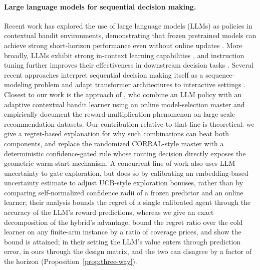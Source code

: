 \documentclass[anon]{alt2027} %
\begin{document}
\paragraph{Large language models for sequential decision making.}
Recent work has explored the use of large language models (LLMs) as policies
in contextual bandit environments, demonstrating that frozen pretrained
models can achieve strong short-horizon performance even without online
updates \citep{chen2024llmdecision}. More broadly, LLMs exhibit strong
in-context learning capabilities \citep{brown2020language,xie2021explanation,
garg2022can,akyurek2022learning}, and instruction tuning further improves
their effectiveness in downstream decision tasks
\citep{ouyang2022training,chung2024scaling}. Several recent approaches
interpret sequential decision making itself as a sequence-modeling problem
and adapt transformer architectures to interactive settings
\citep{chen2021decision,zheng2022online,reid2022can,sun2023smart,
raparthy2023generalization,lee2023supervised}.
Closest to our work is the approach of \citet{chen2024llmdecision}, who
combine an LLM policy with an adaptive contextual bandit learner using an
online model-selection master and empirically document the
reward-multiplication phenomenon on large-scale recommendation datasets.
Our contribution relative to that line is theoretical: we give a
regret-based explanation for why such combinations can beat both components,
and replace the randomized CORRAL-style master with a deterministic
confidence-gated rule whose routing decision directly exposes the geometric
warm-start mechanism. A concurrent line of work \citep{huangcontextual} also
uses LLM uncertainty to gate exploration, but does so by calibrating an
embedding-based uncertainty estimate to adjust UCB-style exploration
bonuses, rather than by comparing self-normalized confidence radii of a
frozen predictor and an online learner; their analysis bounds the regret
of a single calibrated agent through the accuracy of the LLM's reward
predictions, whereas we give an exact decomposition of the hybrid's
advantage, bound the regret ratio over the cold learner on any finite-arm
instance by a ratio of coverage prices, and show the bound is attained; in
their setting the LLM's value enters through prediction error, in ours
through the design matrix, and the two can disagree by a factor of the
horizon (Proposition~\ref{prop:three-way}).
\end{document}
